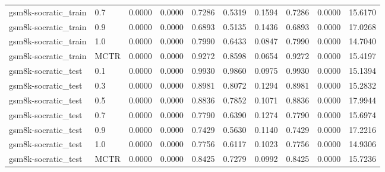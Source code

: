 \begin{tabular}{llrrrrrrrr}
gsm8k-socratic_train & 0.7 & 0.0000 & 0.0000 & 0.7286 & 0.5319 & 0.1594 & 0.7286 & 0.0000 & 15.6170 \\
gsm8k-socratic_train & 0.9 & 0.0000 & 0.0000 & 0.6893 & 0.5135 & 0.1436 & 0.6893 & 0.0000 & 17.0268 \\
gsm8k-socratic_train & 1.0 & 0.0000 & 0.0000 & 0.7990 & 0.6433 & 0.0847 & 0.7990 & 0.0000 & 14.7040 \\
gsm8k-socratic_train & MCTR & 0.0000 & 0.0000 & 0.9272 & 0.8598 & 0.0654 & 0.9272 & 0.0000 & 15.4197 \\
gsm8k-socratic_test & 0.1 & 0.0000 & 0.0000 & 0.9930 & 0.9860 & 0.0975 & 0.9930 & 0.0000 & 15.1394 \\
gsm8k-socratic_test & 0.3 & 0.0000 & 0.0000 & 0.8981 & 0.8072 & 0.1294 & 0.8981 & 0.0000 & 15.2832 \\
gsm8k-socratic_test & 0.5 & 0.0000 & 0.0000 & 0.8836 & 0.7852 & 0.1071 & 0.8836 & 0.0000 & 17.9944 \\
gsm8k-socratic_test & 0.7 & 0.0000 & 0.0000 & 0.7790 & 0.6390 & 0.1274 & 0.7790 & 0.0000 & 15.6974 \\
gsm8k-socratic_test & 0.9 & 0.0000 & 0.0000 & 0.7429 & 0.5630 & 0.1140 & 0.7429 & 0.0000 & 17.2216 \\
gsm8k-socratic_test & 1.0 & 0.0000 & 0.0000 & 0.7756 & 0.6117 & 0.1023 & 0.7756 & 0.0000 & 14.9306 \\
gsm8k-socratic_test & MCTR & 0.0000 & 0.0000 & 0.8425 & 0.7279 & 0.0992 & 0.8425 & 0.0000 & 15.7236 \\
\bottomrule
\end{tabular}
